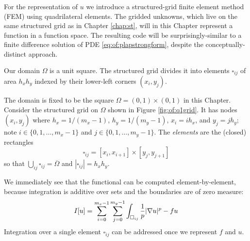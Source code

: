 For the representation of $u$ we introduce a structured-grid finite element method (FEM) using quadrilateral elements.  The gridded unknowns, which live on the same structured grid as in Chapter \ref{chap:st}, will in this Chapter represent a function in a function space.  The resulting code will be surprisingly-similar to a finite difference solution of PDE \eqref{eq:of:plapstrongform}, despite the conceptually-distinct approach.

\begin{marginfigure}
\caption{Our domain $\Omega$ is a unit square.  The structured grid divides it into elements $\square_{ij}$ of area $h_x h_y$ indexed by their lower-left corners $(x_i,y_j)$.}
\label{fig:of:q1grid}
\end{marginfigure}

The domain is fixed to be the square $\Omega = (0,1)\times (0,1)$ in this Chapter.  Consider the structured grid on $\Omega$ shown in Figure \ref{fig:of:q1grid}.  It has nodes $(x_i,y_j)$ where $h_x=1/(m_x-1)$, $h_y=1/(m_y-1)$, $x_i = i h_x$, and $y_j = j h_y$; note $i\in \{0,1,\dots,m_x-1\}$ and $j\in\{0,1,\dots,m_y-1\}$.  The \emph{elements} are the (closed) rectangles
   $$\square_{ij} = [x_i,x_{i+1}] \times [y_j,y_{j+1}]$$
so that $\bigcup_{ij} \square_{ij} = \overline{\Omega}$ and $|\square_{ij}| = h_x h_y$.

We immediately see that the functional can be computed element-by-element, because integration is additive over sets and the boundaries are of zero measure:
\begin{equation}
I[u] = \sum_{i=0}^{m_x-1} \sum_{j=0}^{m_y-1} \int_{\square_{ij}} \frac{1}{p} |\nabla u|^p - fu  \label{eq:of:sumoverelements}
\end{equation}
Integration over a single element $\square_{ij}$ can be addressed once we represent $f$ and $u$.

